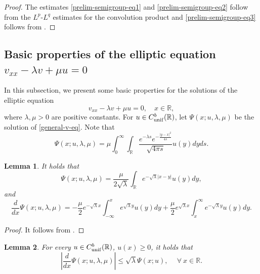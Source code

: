 \documentclass[11pt]{article} %
\newtheorem{lemma}{Lemma}[section]
\theoremstyle{remark}
\theoremstyle{remark}
\numberwithin{equation}{section}
\numberwithin{figure}{section}
\numberwithin{table}{section}
\def\R{\mathbb R}
\newcommand\RR{\ensuremath{\mathbb{R}}}
\begin{document}
\begin{proof}
The estimates \eqref{prelim-semigroup-eq1} and \eqref{prelim-semigroup-eq2} follow from  the $L^p$-$L^q$ estimates for the convolution product 
and \eqref{prelim-semigroup-eq3}  follows from \cite[Lemma 3.1]{SaSh2017}.
\end{proof}

\subsection{Basic properties of the elliptic equation $v_{xx}-\lambda  v+ \mu u=0$}


In this subsection, we present some basic properties for the solutions of the elliptic equation
\begin{equation}
\label{general-v-eq}
v_{xx}-\lambda  v+ \mu u=0,\quad x\in\RR,
\end{equation}
where $\lambda,\mu>0$ are positive constants. 
For  $u\in C^b_{\rm unif}(\R)$, let $\Psi(x;u,\lambda,\mu)$ be the solution of \eqref{general-v-eq}.
Note that
\begin{equation}\label{psi-eq1}
\Psi(x;u,\lambda,\mu)=\mu \int_{0}^{\infty}\int_{\R}\frac{e^{-\lambda  s}e^{-\frac{|y-x|^2}{4s}}}{\sqrt{4\pi s}}u(y)dyds.
\end{equation}


\begin{lemma}
\label{prelim-v-lm1} It holds that
\begin{equation}\label{psi-eq2}
\Psi(x;u,\lambda, \mu)=\frac{\mu  }{2\sqrt{\lambda}}\int_{\R}e^{-\sqrt{\lambda } |x-y|}u(y)dy,
\end{equation}
and
\begin{equation}\label{psi-eq3}
\frac{d}{dx}\Psi(x;u,\lambda,\mu )=-\frac{\mu  }{2}e^{-\sqrt{\lambda}  x}\int_{-\infty}^xe^{\sqrt{\lambda}  y}u(y)dy + \frac{\mu }{2}e^{\sqrt {\lambda} x}\int_{x}^{\infty}e^{-\sqrt{\lambda}  y}u(y)dy.
\end{equation}
\end{lemma}




\begin{proof}
It follows from \cite[Lemma 2.1]{SaShXu2019}.
\end{proof}

\begin{lemma}\label{prelim-v-lm2}
For every $u\in C^b_{\rm unif}(\R)$, $u(x)\ge 0$, it holds that
\begin{equation}\label{estimate-on-space-derivative-1}
\left| \frac{d}{dx}\Psi(x;u,\lambda,\mu)\right|\leq \sqrt{\lambda} \Psi(x;u),\ \quad  \forall\ x\in\R.
\end{equation}
\end{lemma}
\end{document}
